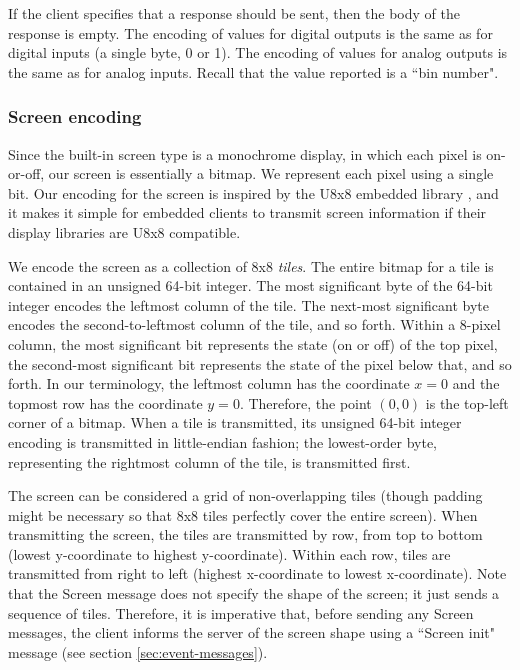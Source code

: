 \documentclass[12pt]{article}
\begin{document}
\begin{appendices}
If the client specifies that a response should be sent, then the body of the response is empty.  The encoding of values for digital outputs is the same as for digital inputs (a single byte, 0 or 1).  The encoding of values for analog outputs is the same as for analog inputs.  Recall that the value reported is a ``bin number".

\subsubsection{Screen encoding}
Since the built-in screen type is a monochrome display, in which each pixel is on-or-off, our screen is essentially a bitmap.  We represent each pixel using a single bit.  Our encoding for the screen is inspired by the U8x8 embedded library \cite{u8x8}, and it makes it simple for embedded clients to transmit screen information if their display libraries are U8x8 compatible.

We encode the screen as a collection of 8x8 \textit{tiles}.  The entire bitmap for a tile is contained in an unsigned 64-bit integer.  The most significant byte of the 64-bit integer encodes the leftmost column of the tile.  The next-most significant byte encodes the second-to-leftmost column of the tile, and so forth.  Within a 8-pixel column, the most significant bit represents the state (on or off) of the top pixel, the second-most significant bit represents the state of the pixel below that, and so forth.  In our terminology, the leftmost column has the coordinate $x=0$ and the topmost row has the coordinate $y=0$.  Therefore, the point $(0, 0)$ is the top-left corner of a bitmap.  When a tile is transmitted, its unsigned 64-bit integer encoding is transmitted in little-endian fashion; the lowest-order byte, representing the rightmost column of the tile, is transmitted first.

The screen can be considered a grid of non-overlapping tiles (though padding might be necessary so that 8x8 tiles perfectly cover the entire screen).  When transmitting the screen, the tiles are transmitted by row, from top to bottom (lowest y-coordinate to highest y-coordinate).  Within each row, tiles are transmitted from right to left (highest x-coordinate to lowest x-coordinate).  Note that the Screen message does not specify the shape of the screen; it just sends a sequence of tiles.  Therefore, it is imperative that, before sending any Screen messages, the client informs the server of the screen shape using a ``Screen init" message (see section \ref{sec:event-messages}).


\end{appendices}
\end{document}

